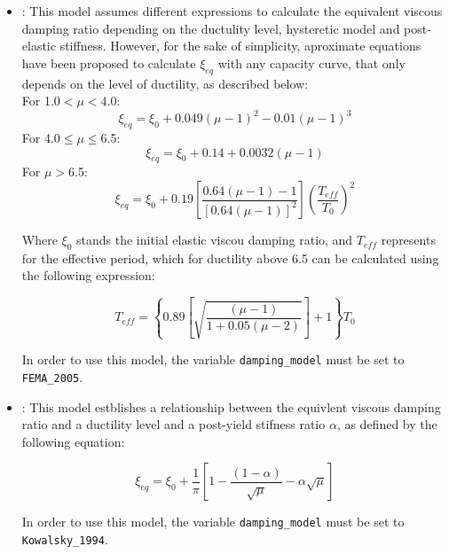 \begin{itemize}
\item \cite{FEMA4402005}: This model assumes different expressions to calculate the equivalent viscous damping ratio depending on the ductulity level, hysteretic model and post-elastic stiffness. However, for the sake of simplicity, aproximate equations have been proposed to calculate $\xi_{eq}$ with any capacity curve, that only depends on the level of ductility, as described below:\\

For 1.0$<\mu<$4.0:
\begin{equation}
\xi_{eq} = \xi_0 + 0.049\left(\mu-1\right)^2-0.01\left(\mu-1\right)^3
\end{equation} 
For 4.0$	\le\mu\le$6.5:
\begin{equation}
\xi_{eq} = \xi_0 + 0.14+0.0032\left(\mu-1\right)
\end{equation} 
For $\mu>$6.5:
\begin{equation}
\xi_{eq} = \xi_0 + 0.19\left[\frac{0.64\left(\mu-1\right)-1}{\left[0.64\left(\mu-1\right)\right]^2}\right]\left(\frac{T_{eff}}{T_0}\right)^2
\end{equation} 

Where $\xi_0$ stands the initial elastic viscou damping ratio, and $T_{eff}$ represents for the effective period, which for ductility above 6.5 can be calculated using the following expression:

\begin{equation}
T_{eff} = \left\{0.89\left[\sqrt{\frac{(\mu-1)}{1+0.05(\mu-2)}}\right]+1\right\}T_0
\end{equation}

In order to use this model, the variable \verb=damping_model= must be set to \verb=FEMA_2005=.\\

\item \cite{Kowalsky1994}: This model estblishes a relationship between the equivlent viscous damping ratio and a ductility level and a post-yield stifness ratio $\alpha$, as defined by the following equation:

\begin{equation}
\xi_{eq} = \xi_0 + \frac{1}{\pi}\left[1-\frac{(1-\alpha)}{\sqrt{\mu}} - \alpha\sqrt{\mu} \right]
\end{equation}

In order to use this model, the variable \verb=damping_model= must be set to \verb=Kowalsky_1994=.\\


\end{itemize}
